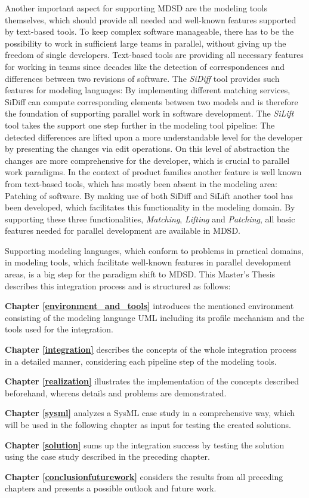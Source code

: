 Another important aspect for supporting \ac{MDSD} are the modeling tools
themselves, which should provide all needed and well-known features 
supported by text-based tools. To keep complex software manageable, there has to be the possibility to work in
sufficient large teams in parallel, without giving up the freedom of single
developers. Text-based tools are providing all necessary features for working
in teams since decades like the detection of correspondences and
differences between two revisions of software. The \textit{SiDiff} tool provides
such features for modeling languages: By implementing different
matching services, SiDiff can compute corresponding elements between two models
and is therefore the foundation of supporting parallel work in software
development. The \textit{SiLift} tool takes the support one step further in the
modeling tool pipeline: The detected differences are lifted upon a more
understandable level for the developer by presenting the changes via edit
operations. On this level of abstraction the changes are more comprehensive for
the developer,
which is crucial to parallel work paradigms. In the context of product families another feature is
well known from text-based tools, which has mostly been absent in the modeling
area: Patching of software. By making use of both SiDiff and SiLift another tool
has been developed, which facilitates this functionality in the modeling domain.
By supporting these three functionalities, \textit{Matching}, \textit{Lifting}
and \textit{Patching}, all basic features needed for parallel development are
available in \ac{MDSD}.

Supporting modeling languages, which conform to problems in
practical domains, in modeling tools, which facilitate well-known features in
parallel development areas, is a big step for the paradigm
shift to \ac{MDSD}. This Master's Thesis describes this integration process and
is structured as follows:

\textbf{Chapter \ref{environment_and_tools}} introduces the mentioned
environment consisting of the modeling language \ac{UML} including its profile
mechanism and the tools used for the integration.

\textbf{Chapter \ref{integration}} describes the concepts of the whole
integration process in a detailed manner, considering each pipeline step of the
modeling tools.

\textbf{Chapter \ref{realization}} illustrates the implementation of the
concepts described beforehand, whereas details and problems are
demonstrated.

\textbf{Chapter \ref{sysml}} analyzes a \ac{SysML} case study in a comprehensive
way, which will be used in the following chapter as input for testing the created solutions.

\textbf{Chapter \ref{solution}} sums up the integration success by
testing the solution using the case study described in the preceding chapter.

\textbf{Chapter \ref{conclusionfuturework}} considers the results from all
preceding chapters and presents a possible outlook and future work.



